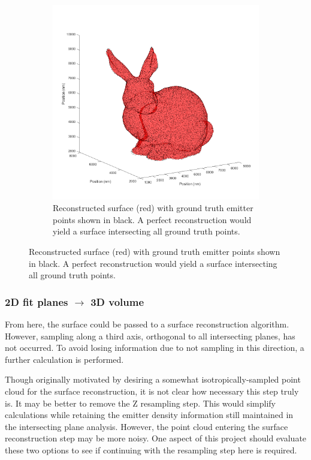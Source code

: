 \documentclass[10pt,a4paper]{article}
\begin{document}
\begin{figure}
\begin{subfigure}[b]{.45\textwidth}
		\label{fig:bunnyMeridians}
	\end{subfigure}
	\vfill
	\begin{subfigure}[b]{.65\textwidth}
		\centering
		\includegraphics[width=\textwidth]{./figures/bunnyRecon+GroundTruty.png}
		\caption[Step3]{Reconstructed surface (red) with ground truth emitter points shown in black. A perfect reconstruction would yield a surface intersecting all ground truth points.}
		\label{fig:bunnyRecon}
	\end{subfigure}
\end{figure}

\subsubsection{2D fit planes $\rightarrow$ 3D volume}

From here, the surface could be passed to a surface reconstruction algorithm.  However, sampling along a third axis, orthogonal to all intersecting planes, has not occurred.  To avoid losing information due to not sampling in this direction, a further calculation is performed. 

Though originally motivated by desiring a somewhat isotropically-sampled point cloud for the surface reconstruction, it is not clear how necessary this step truly is.  It may be better to remove the Z resampling step.  This would simplify calculations while retaining the emitter density information still maintained in the intersecting plane analysis.  However, the point cloud entering the surface reconstruction step may be more noisy.  One aspect of this project should evaluate these two options to see if continuing with the resampling step here is required.  
\end{document}
